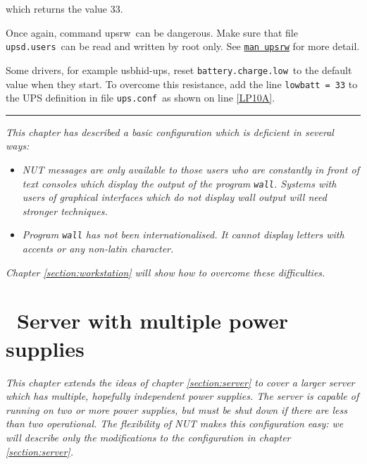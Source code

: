 \documentclass[12pt]{article}
\newlength{\headersep}\setlength{\headersep}{3mm}
\newcommand{\Hsep}{\hspace{\headersep}}
\newcommand{\newcolumn}{\vfill\eject}
\newcommand{\usbhidups}{\mbox{\textcolor{UPSDCOLOUR}{usbhid-ups}}}
\newcommand{\upsrw}{\mbox{\textcolor{UPSMONCOLOUR}{upsrw}}}
\newcommand{\upsconf}{\textcolor{UPSDCOLOUR}{\texttt{ups.conf}}}
\newcommand{\upsdusers}{\textcolor{UPSDCOLOUR}{\texttt{upsd.users}}}
\newcommand{\batterychargelow}{\textcolor{UPSDCOLOUR}{\texttt{battery{\allowbreak}.charge{\allowbreak}.low}}}
\newcommand{\NUTman}[1]{\href{https://networkupstools.org/docs/man/#1.html}{\texttt{man #1}}}
\newcommand{\ul}{\begin{itemize}%
   \setlength{\itemsep}{0em}}
\newcommand{\eul}{\end{itemize}}
\newcommand{\li}{\item}                 %
\begin{document}
\noindent which returns the value 33.

Once again, command \upsrw\ can be dangerous.  Make sure that file
\upsdusers\ can be read and written by root only.  See \NUTman{upsrw} for more
detail.

Some drivers, for example \usbhidups, reset \batterychargelow\ to the default
value when they start.  To overcome this resistance, add the line
\texttt{lowbatt = 33} to the UPS definition in file \upsconf\ as shown on line
\ref{LP10A}.

\vspace*{\fill}
\begin{center}\rule{\LinePrinterwidth}{0.5mm}\end{center}
\vspace*{\fill}

\textsl{This chapter has described a basic configuration which is deficient in
  several ways:}

\ul

\li \textsl{NUT messages are only available to those users who are constantly
  in front of text consoles which display the output of the program
  \texttt{wall}.  Systems with users of graphical interfaces which do not
  display wall output will need stronger techniques.}

\li \textsl{Program \texttt{wall} has not been internationalised.  It cannot
  display letters with accents or any non-latin character.}

\eul
 
\textsl{Chapter \ref{section:workstation} will show how to overcome these
  difficulties.}

\vspace*{\fill}

\begin{center}
\end{center}

\vspace*{\fill}

\newcolumn
\section{\Hsep\ Server with multiple power supplies}\label{section:dual}

\textsl{This chapter extends the ideas of chapter \ref{section:server} to
  cover a larger server which has multiple, hopefully independent power
  supplies.  The server is capable of running on two or more power supplies,
  but must be shut down if there are less than two operational.  The
  flexibility of NUT makes this configuration easy: we will describe only the
  modifications to the configuration in chapter \ref{section:server}.}
\end{document}
